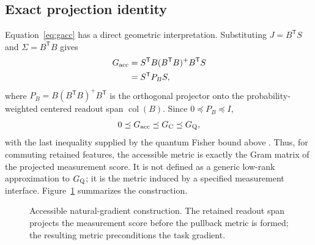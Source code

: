 \subsection{Exact projection identity}
Equation~\eqref{eq:gacc} has a direct geometric interpretation. Substituting $J=B^{\mathsf T}S$ and $\Sigma=B^{\mathsf T}B$ gives
\begin{align}
 G_{\mathrm{acc}}
 &=S^{\mathsf T}B(B^{\mathsf T}B)^{+}B^{\mathsf T}S\\
 &=S^{\mathsf T}P_BS,
 \label{eq:projection_identity}
\end{align}
where $P_B=B(B^{\mathsf T}B)^+B^{\mathsf T}$ is the orthogonal projector onto the probability-weighted centered readout span $\operatorname{col}(B)$. Since $0\preceq P_B\preceq I$,
\begin{equation}
 0\preceq G_{\mathrm{acc}}\preceq G_{\rm C}\preceq G_{\rm Q},
\end{equation}
with the last inequality supplied by the quantum Fisher bound above \cite{Braunstein1994}. Thus, for commuting retained features, the accessible metric is exactly the Gram matrix of the projected measurement score. It is not defined as a generic low-rank approximation to $G_{\rm Q}$; it is the metric induced by a specified measurement interface. Figure~\ref{fig:accessible_geometry} summarizes the construction.

\begin{figure}[t]
\centering
{}
\caption{Accessible natural-gradient construction. The retained readout span projects the measurement score before the pullback metric is formed; the resulting metric preconditions the task gradient.}
\label{fig:accessible_geometry}
\end{figure}

